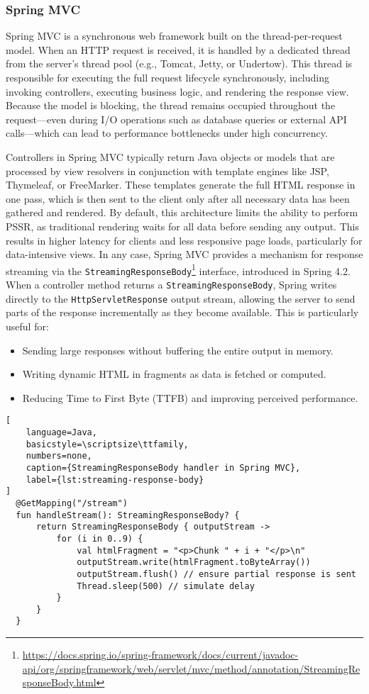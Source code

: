 \subsubsection{Spring MVC}

Spring MVC is a synchronous web framework built on the thread-per-request
model. When an HTTP request is received, it is handled by a dedicated thread
from the server’s thread pool (e.g., Tomcat, Jetty, or Undertow). This thread
is responsible for executing the full request lifecycle synchronously,
including invoking controllers, executing business logic, and rendering the
response view. Because the model is blocking, the thread remains occupied
throughout the request—even during I/O operations such as database queries or
external API calls—which can lead to performance bottlenecks under high
concurrency.

Controllers in Spring MVC typically return Java objects or models that are
processed by view resolvers in conjunction with template engines like JSP,
Thymeleaf, or FreeMarker. These templates generate the full HTML response in
one pass, which is then sent to the client only after all necessary data has
been gathered and rendered. By default, this architecture limits the ability to
perform PSSR, as traditional rendering waits for all data before sending any
output. This results in higher latency for clients and less responsive page
loads, particularly for data-intensive views. In any case, Spring MVC provides a
mechanism for response streaming via the
\texttt{StreamingResponseBody}\footnote{\url{https://docs.spring.io/spring-framework/docs/current/javadoc-api/org/springframework/web/servlet/mvc/method/annotation/StreamingResponseBody.html}}
interface, introduced in Spring 4.2. When a controller method returns a
\texttt{StreamingResponseBody}, Spring writes directly to the
\texttt{HttpServletResponse} output stream, allowing the server to send parts
of the response incrementally as they become available. This is particularly
useful for:
\begin{itemize}
    \item Sending large responses without buffering the entire output in memory.
    \item Writing dynamic HTML in fragments as data is fetched or computed.
    \item Reducing Time to First Byte (TTFB) and improving perceived performance.
\end{itemize}

\begin{lstlisting}[
    language=Java,
    basicstyle=\scriptsize\ttfamily,
    numbers=none,
    caption={StreamingResponseBody handler in Spring MVC},
    label={lst:streaming-response-body}
]
  @GetMapping("/stream")
  fun handleStream(): StreamingResponseBody? {
      return StreamingResponseBody { outputStream ->
          for (i in 0..9) {
              val htmlFragment = "<p>Chunk " + i + "</p>\n"
              outputStream.write(htmlFragment.toByteArray())
              outputStream.flush() // ensure partial response is sent
              Thread.sleep(500) // simulate delay
          }
      }
  }
\end{lstlisting}

